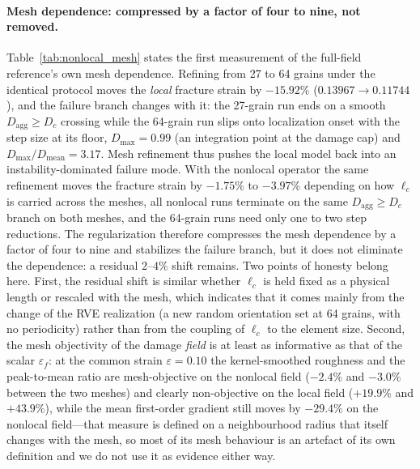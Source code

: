 \documentclass[11pt,a4paper,twocolumn]{article}
\begin{document}
\paragraph{Mesh dependence: compressed by a factor of four to nine, not removed.} Table~\ref{tab:nonlocal_mesh}
states the first measurement of the full-field reference's own mesh dependence. Refining from 27 to 64 grains
under the identical protocol moves the \emph{local} fracture strain by $-15.92\%$ ($0.13967 \to 0.11744$), and
the failure branch changes with it: the 27-grain run ends on a smooth $D_{\mathrm{agg}} \ge D_c$ crossing while
the 64-grain run slips onto localization onset with the step size at its floor, $D_{\max} = 0.99$ (an
integration point at the damage cap) and $D_{\max}/D_{\mathrm{mean}} = 3.17$. Mesh refinement thus pushes the
local model back into an instability-dominated failure mode. With the nonlocal operator the same refinement
moves the fracture strain by $-1.75\%$ to $-3.97\%$ depending on how $\ell_c$ is carried across the meshes, all
nonlocal runs terminate on the same $D_{\mathrm{agg}} \ge D_c$ branch on both meshes, and the 64-grain runs
need only one to two step reductions. The regularization therefore compresses the mesh dependence by a factor
of four to nine and stabilizes the failure branch, but it does not eliminate the dependence: a residual
$2$--$4\%$ shift remains. Two points of honesty belong here. First, the residual shift is similar whether
$\ell_c$ is held fixed as a physical length or rescaled with the mesh, which indicates that it comes mainly
from the change of the RVE realization (a new random orientation set at 64 grains, with no periodicity) rather
than from the coupling of $\ell_c$ to the element size. Second, the mesh objectivity of the damage \emph{field}
is at least as informative as that of the scalar $\varepsilon_f$: at the common strain $\varepsilon = 0.10$ the
kernel-smoothed roughness and the peak-to-mean ratio are mesh-objective on the nonlocal field ($-2.4\%$ and
$-3.0\%$ between the two meshes) and clearly non-objective on the local field ($+19.9\%$ and $+43.9\%$), while
the mean first-order gradient still moves by $-29.4\%$ on the nonlocal field---that measure is defined on a
neighbourhood radius that itself changes with the mesh, so most of its mesh behaviour is an artefact of its own
definition and we do not use it as evidence either way.
\end{document}
